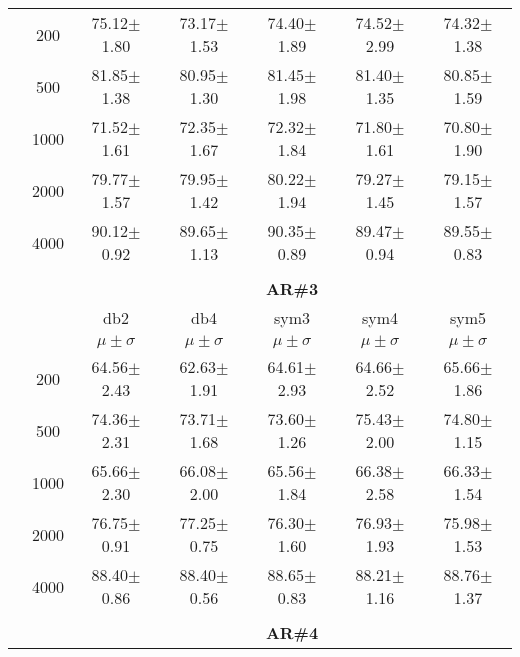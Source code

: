 \begin{table}[H]
\begin{tabular}{|c|c|c c c c c|}
\multicolumn{1}{|c|}{ \multirow{5}{*}{\rotatebox[origin=c]{90}{\textbf{Neurônios}}} }
&200	&75.12$\pm$1.80	&73.17$\pm$1.53	&74.40$\pm$1.89	&74.52$\pm$2.99	&74.32$\pm$1.38\\\cline{2-7}
&500	&81.85$\pm$1.38	&80.95$\pm$1.30	&81.45$\pm$1.98	&81.40$\pm$1.35	&80.85$\pm$1.59\\\cline{2-7}
&1000	&71.52$\pm$1.61 &72.35$\pm$1.67	&72.32$\pm$1.84	&71.80$\pm$1.61	&70.80$\pm$1.90\\\cline{2-7}
&2000	&79.77$\pm$1.57	&79.95$\pm$1.42	&80.22$\pm$1.94	&79.27$\pm$1.45	&79.15$\pm$1.57\\\cline{2-7}
&4000	&90.12$\pm$0.92	&89.65$\pm$1.13	&90.35$\pm$0.89	&89.47$\pm$0.94	&89.55$\pm$0.83





\\ \midrule
\multicolumn{7}{c}{}\\ 



\cline{3-7}
\multicolumn{2}{c|}{\multirow{3}{*}{}} & \multicolumn{5}{c|}{\textbf{AR\#3}}   \\\cline{3-7} 

\multicolumn{2}{c|}{}  & db2 & db4 & sym3 & sym4 & sym5 \\\cline{3-7}
\multicolumn{2}{c|}{}& $\mu \pm \sigma$ & $\mu \pm \sigma$ & $\mu \pm \sigma$ & $\mu \pm \sigma$ & $\mu \pm \sigma$ \\\hline

\multicolumn{1}{|c|}{ \multirow{5}{*}{\rotatebox[origin=c]{90}{\textbf{Neurônios}}} }
&200	&64.56$\pm$2.43	&62.63$\pm$1.91	&64.61$\pm$2.93	&64.66$\pm$2.52	&65.66$\pm$1.86\\\cline{2-7}
&500	&74.36$\pm$2.31	&73.71$\pm$1.68	&73.60$\pm$1.26	&75.43$\pm$2.00	&74.80$\pm$1.15\\\cline{2-7}
&1000	&65.66$\pm$2.30	&66.08$\pm$2.00	&65.56$\pm$1.84	&66.38$\pm$2.58	&66.33$\pm$1.54\\\cline{2-7}
&2000	&76.75$\pm$0.91	&77.25$\pm$0.75	&76.30$\pm$1.60	&76.93$\pm$1.93	&75.98$\pm$1.53\\\cline{2-7}
&4000	&88.40$\pm$0.86	&88.40$\pm$0.56	&88.65$\pm$0.83	&88.21$\pm$1.16	&88.76$\pm$1.37



\\\midrule 
\multicolumn{7}{c}{}\\ 



\cline{3-7}
\multicolumn{2}{c|}{\multirow{3}{*}{}} & \multicolumn{5}{c|}{\textbf{AR\#4}}   \\\cline{3-7} 


\end{tabular}
\end{table}
